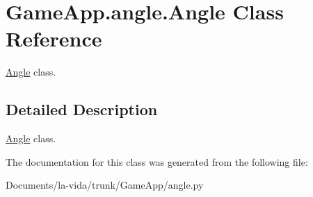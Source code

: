 \hypertarget{classGameApp_1_1angle_1_1Angle}{
\section{GameApp.angle.Angle Class Reference}
\label{classGameApp_1_1angle_1_1Angle}
}
\hyperlink{classGameApp_1_1angle_1_1Angle}{Angle} class.  




\subsection{Detailed Description}
\hyperlink{classGameApp_1_1angle_1_1Angle}{Angle} class. 

The documentation for this class was generated from the following file:\begin{CompactItemize}
\item 
Documents/la-vida/trunk/GameApp/angle.py\end{CompactItemize}

